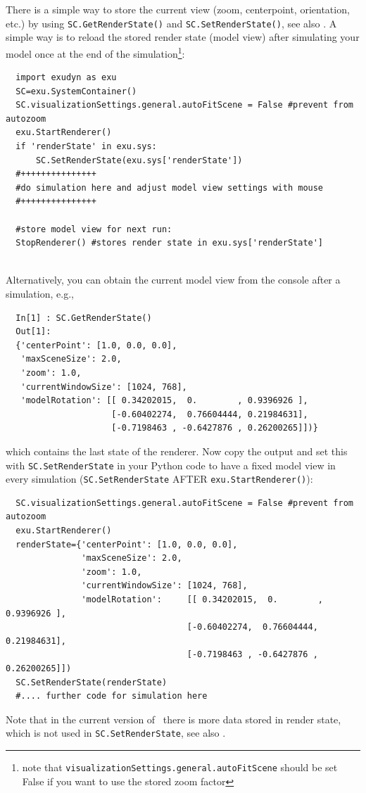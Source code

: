 \label{sec:storing:modelview}
There is a simple way to store the current view (zoom, centerpoint, orientation, etc.) by using \texttt{SC.GetRenderState()} and \texttt{SC.SetRenderState()},
see also .
%
A simple way is to reload the stored render state (model view) after simulating your model once at the end of the simulation\footnote{
note that \texttt{visualizationSettings.general.autoFitScene} should be set False if you want to use the stored zoom factor}:
\pythonstyle\begin{lstlisting}
  import exudyn as exu
  SC=exu.SystemContainer()
  SC.visualizationSettings.general.autoFitScene = False #prevent from autozoom
  exu.StartRenderer()
  if 'renderState' in exu.sys:
      SC.SetRenderState(exu.sys['renderState']) 
  #+++++++++++++++
  #do simulation here and adjust model view settings with mouse
  #+++++++++++++++

  #store model view for next run:
  StopRenderer() #stores render state in exu.sys['renderState']
\end{lstlisting}
\horizontalRuler \\
%
Alternatively, you can obtain the current model view from the console after a simulation, e.g.,
\pythonstyle\begin{lstlisting}
  In[1] : SC.GetRenderState()
  Out[1]: 
  {'centerPoint': [1.0, 0.0, 0.0],
   'maxSceneSize': 2.0,
   'zoom': 1.0,
   'currentWindowSize': [1024, 768],
   'modelRotation': [[ 0.34202015,  0.        , 0.9396926 ],
                     [-0.60402274,  0.76604444, 0.21984631],
                     [-0.7198463 , -0.6427876 , 0.26200265]])}
\end{lstlisting}
%
which contains the last state of the renderer.
Now copy the output and set this with \texttt{SC.SetRenderState} in your Python code to have a fixed model view in every simulation (\texttt{SC.SetRenderState} AFTER \texttt{exu.StartRenderer()}):
\pythonstyle\begin{lstlisting}
  SC.visualizationSettings.general.autoFitScene = False #prevent from autozoom
  exu.StartRenderer()
  renderState={'centerPoint': [1.0, 0.0, 0.0],
               'maxSceneSize': 2.0,
               'zoom': 1.0,
               'currentWindowSize': [1024, 768],
               'modelRotation':     [[ 0.34202015,  0.        ,  0.9396926 ],
                                    [-0.60402274,  0.76604444,  0.21984631],
                                    [-0.7198463 , -0.6427876 ,  0.26200265]])
  SC.SetRenderState(renderState)
  #.... further code for simulation here
\end{lstlisting}
Note that in the current version of \codeName\ there is more data stored in render state, which is not used in \texttt{SC.SetRenderState},
see also .
\horizontalRuler
%

